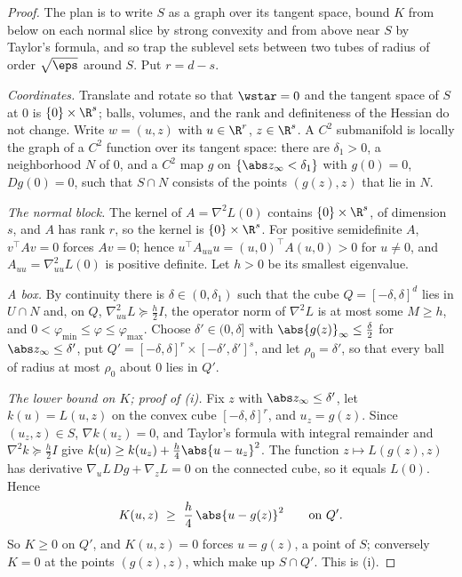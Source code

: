 \begin{refsection}
\begin{proof}
The plan is to write $S$ as a graph over its tangent space, bound $K$ from below on each normal slice by strong convexity and from above near $S$ by Taylor's formula, and so trap the sublevel sets between two tubes of radius of order $\sqrt\eps$ around $S$. Put $r=d-s$.

\emph{Coordinates.} Translate and rotate so that $\wstar=0$ and the tangent space of $S$ at $0$ is $\{0\}\times\R^s$; balls, volumes, and the rank and definiteness of the Hessian do not change. Write $w=(u,z)$ with $u\in\R^r$, $z\in\R^s$. A $C^2$ submanifold is locally the graph of a $C^2$ function over its tangent space: there are $\delta_1>0$, a neighborhood $N$ of $0$, and a $C^2$ map $g$ on $\{\abs z_\infty<\delta_1\}$ with $g(0)=0$, $Dg(0)=0$, such that $S\cap N$ consists of the points $(g(z),z)$ that lie in $N$.

\emph{The normal block.} The kernel of $A=\nabla^2L(0)$ contains $\{0\}\times\R^s$, of dimension $s$, and $A$ has rank $r$, so the kernel is $\{0\}\times\R^s$. For positive semidefinite $A$, $v^\top Av=0$ forces $Av=0$; hence $u^\top A_{uu}u=(u,0)^\top A(u,0)>0$ for $u\ne0$, and $A_{uu}=\nabla^2_{uu}L(0)$ is positive definite. Let $h>0$ be its smallest eigenvalue.

\emph{A box.} By continuity there is $\delta\in(0,\delta_1)$ such that the cube $Q=[-\delta,\delta]^d$ lies in $U\cap N$ and, on $Q$, $\nabla^2_{uu}L\succeq\frac h2I$, the operator norm of $\nabla^2L$ is at most some $M\ge h$, and $0<\varphi_{\min}\le\varphi\le\varphi_{\max}$. Choose $\delta'\in(0,\delta]$ with $\abs{g(z)}_\infty\le\frac\delta2$ for $\abs z_\infty\le\delta'$, put $Q'=[-\delta,\delta]^r\times[-\delta',\delta']^s$, and let $\rho_0=\delta'$, so that every ball of radius at most $\rho_0$ about $0$ lies in $Q'$.

\emph{The lower bound on $K$; proof of (i).} Fix $z$ with $\abs z_\infty\le\delta'$, let $k(u)=L(u,z)$ on the convex cube $[-\delta,\delta]^r$, and $u_z=g(z)$. Since $(u_z,z)\in S$, $\nabla k(u_z)=0$, and Taylor's formula with integral remainder and $\nabla^2k\succeq\frac h2I$ give $k(u)\ge k(u_z)+\frac h4\abs{u-u_z}^2$. The function $z\mapsto L(g(z),z)$ has derivative $\nabla_uL\,Dg+\nabla_zL=0$ on the connected cube, so it equals $L(0)$. Hence
\begin{equation}\label{eq:stages:below}
K(u,z)\ \ge\ \frac h4\,\abs{u-g(z)}^2\qquad\text{on }Q'.
\end{equation}
So $K\ge0$ on $Q'$, and $K(u,z)=0$ forces $u=g(z)$, a point of $S$; conversely $K=0$ at the points $(g(z),z)$, which make up $S\cap Q'$. This is (i).


\end{proof}
\end{refsection}
